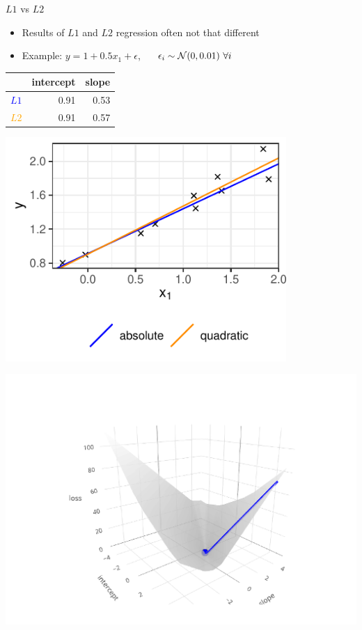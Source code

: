 \documentclass[11pt,compress,t,notes=noshow, xcolor=table]{beamer}
\begin{document}
\begin{vbframe}{$L1$ vs $L2$}

\begin{itemize}
    \item Results of $L1$ and $L2$ regression often not that different
    \item Example: $y = 1 + 0.5 x_1 + \epsilon$, ~~ $\epsilon_i \sim 
    \mathcal{N}(0, 0.01) ~ \forall i$
\end{itemize}
    
\vfill

\begin{minipage}[b]{0.65\textwidth}
    \hspace{0.7cm}
    \footnotesize
    \begin{tabular}{r|r|r}
        & intercept & slope \\ \hline
        \textcolor{blue}{$L1$} & 0.91 & 0.53 \\ \hline
        \textcolor{orange}{$L2$} & 0.91 & 0.57 
    \end{tabular}

    \vspace{0.5cm}
    \includegraphics[width=0.8\textwidth]{figure/reg_l1_comparison.pdf}
\end{minipage}
\begin{minipage}[b]{0.34\textwidth}
    \includegraphics[width=\textwidth, trim=80 0 100 80, clip]{
    figure/reg_l1_comparison_optim_abs.pdf}
    

\end{minipage}
\end{vbframe}
\end{document}
